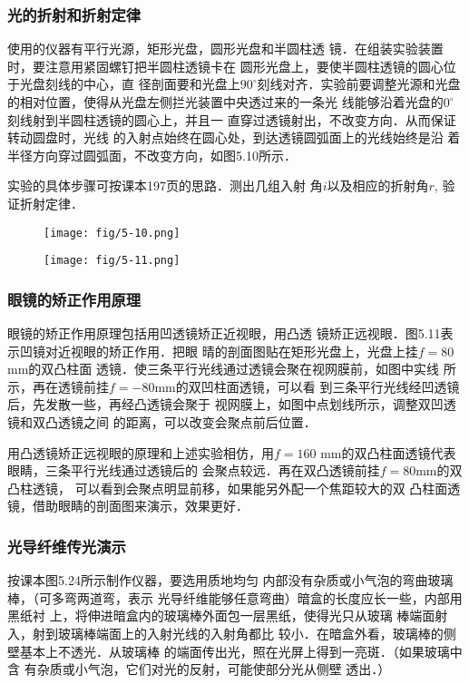 \subsubsection{光的折射和折射定律}
使用的仪器有平行光源，矩形光盘，圆形光盘和半圆柱透
镜．在组装实验装置时，要注意用紧固螺钉把半圆柱透镜卡在
圆形光盘上，要使半圆柱透镜的圆心位于光盘刻线的中心，直
径剖面要和光盘上$90^{\circ}$刻线对齐．实验前要调整光源和光盘
的相对位置，使得从光盘左侧拦光装置中央透过来的一条光
线能够沿着光盘的$0^{\circ}$刻线射到半圆柱透镜的圆心上，并且一
直穿过透镜射出，不改变方向．从而保证转动圆盘时，光线
的入射点始终在圆心处，到达透镜圆弧面上的光线始终是沿
着半径方向穿过圆弧面，不改变方向，如图5.10所示．

实验的具体步骤可按课本197页的思路．测出几组入射
角$i$以及相应的折射角$r$, 验证折射定律．

\begin{figure}[htp]\centering
    \begin{minipage}[t]{0.48\textwidth}
    \centering
    \texttt{[image: fig/5-10.png]}
    \caption{}
    \end{minipage}
    \begin{minipage}[t]{0.48\textwidth}
    \centering
    \texttt{[image: fig/5-11.png]}
    \caption{}
    \end{minipage}
    \end{figure}

\subsubsection{眼镜的矫正作用原理}
眼镜的矫正作用原理包括用凹透镜矫正近视眼，用凸透
镜矫正远视眼．图5.11表示凹镜对近视眼的矫正作用．把眼
晴的剖面图贴在矩形光盘上，光盘上挂$f=80$mm的双凸柱面
透镜．使三条平行光线通过透镜会聚在视网膜前，如图中实线
所示，再在透镜前挂$f=-80$mm的双凹柱面透镜，可以看
到三条平行光线经凹透镜后，先发散一些，再经凸透镜会聚于
视网膜上，如图中点划线所示，调整双凹透镜和双凸透镜之间
的距离，可以改变会聚点前后位置．

用凸透镜矫正远视眼的原理和上述实验相仿，用$f=160$
mm的双凸柱面透镜代表眼睛，三条平行光线通过透镜后的
会聚点较远．再在双凸透镜前挂$f=80$mm的双凸柱透镜，
可以看到会聚点明显前移，如果能另外配一个焦距较大的双
凸柱面透镜，借助眼睛的剖面图来演示，效果更好．

\subsubsection{光导纤维传光演示}
按课本图5.24所示制作仪器，要选用质地均匀
内部没有杂质或小气泡的弯曲玻璃棒，（可多弯两道弯，表示
光导纤维能够任意弯曲）暗盒的长度应长一些，内部用黑纸衬
上，将伸进暗盒内的玻璃棒外面包一层黑纸，使得光只从玻璃
棒端面射入，射到玻璃棒端面上的入射光线的入射角都比
较小．在暗盒外看，玻璃棒的侧壁基本上不透光．从玻璃棒
的端面传出光，照在光屏上得到一亮斑．（如果玻璃中含
有杂质或小气泡，它们对光的反射，可能使部分光从侧壁
透出．）

